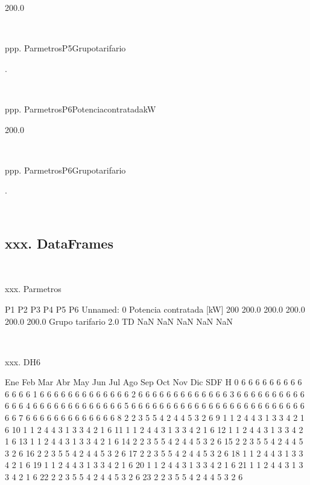 \documentclass[a4paper,10pt]{article}
\begin{document}
\begin{Form}
200.0 \

\

ppp. ParmetrosP5Grupotarifario

. \

\

ppp. ParmetrosP6PotenciacontratadakW

200.0 \

\

ppp. ParmetrosP6Grupotarifario

. \

\
\newpage 
\subsection{xxx. DataFrames}\

xxx. Parmetros

                              P1     P2     P3     P4     P5     P6
Unnamed: 0                                                         
Potencia contratada [kW]     200  200.0  200.0  200.0  200.0  200.0
Grupo tarifario           2.0 TD    NaN    NaN    NaN    NaN    NaN \

\

xxx. DH6

    Ene  Feb  Mar  Abr  May  Jun  Jul  Ago  Sep  Oct  Nov  Dic  SDF
H                                                                  
0     6    6    6    6    6    6    6    6    6    6    6    6    6
1     6    6    6    6    6    6    6    6    6    6    6    6    6
2     6    6    6    6    6    6    6    6    6    6    6    6    6
3     6    6    6    6    6    6    6    6    6    6    6    6    6
4     6    6    6    6    6    6    6    6    6    6    6    6    6
5     6    6    6    6    6    6    6    6    6    6    6    6    6
6     6    6    6    6    6    6    6    6    6    6    6    6    6
7     6    6    6    6    6    6    6    6    6    6    6    6    6
8     2    2    3    5    5    4    2    4    4    5    3    2    6
9     1    1    2    4    4    3    1    3    3    4    2    1    6
10    1    1    2    4    4    3    1    3    3    4    2    1    6
11    1    1    2    4    4    3    1    3    3    4    2    1    6
12    1    1    2    4    4    3    1    3    3    4    2    1    6
13    1    1    2    4    4    3    1    3    3    4    2    1    6
14    2    2    3    5    5    4    2    4    4    5    3    2    6
15    2    2    3    5    5    4    2    4    4    5    3    2    6
16    2    2    3    5    5    4    2    4    4    5    3    2    6
17    2    2    3    5    5    4    2    4    4    5    3    2    6
18    1    1    2    4    4    3    1    3    3    4    2    1    6
19    1    1    2    4    4    3    1    3    3    4    2    1    6
20    1    1    2    4    4    3    1    3    3    4    2    1    6
21    1    1    2    4    4    3    1    3    3    4    2    1    6
22    2    2    3    5    5    4    2    4    4    5    3    2    6
23    2    2    3    5    5    4    2    4    4    5    3    2    6 \


\end{Form}
\end{document}
